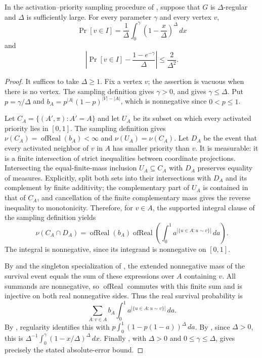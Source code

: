 \begin{lemma}
In the activation--priority sampling procedure of
, suppose that $G$ is $\Delta$-regular
and $\Delta$ is sufficiently large.  For every parameter $\gamma$ and every
vertex $v$,
\[
\Pr[v\in I]=
\frac1\Delta\int_0^\gamma \left(1-\frac{x}{\Delta}\right)^\Delta\,dx
\]
and
\[
\left|\Pr[v\in I]-\frac{1-e^{-\gamma}}{\Delta}\right|
\le \frac2{\Delta^2}.
\]
\end{lemma}
\begin{proof}
It suffices to take $\Delta\ge1$. Fix a vertex $v$; the assertion is
vacuous when there is no vertex. The sampling definition
 gives $\gamma>0$, and
 gives $\gamma\le\Delta$.
Put $p=\gamma/\Delta$ and
$b_A=p^{|A|}(1-p)^{|V|-|A|}$, which is nonnegative since $0<p\le1$.

Let $C_A=\{(A',\pi):A'=A\}$ and let $U_A$ be its subset on which every
activated priority lies in $[0,1]$. The sampling definition gives
$\nu(C_A)=\operatorname{ofReal}(b_A)<\infty$ and
$\nu(U_A)=\nu(C_A)$. Let $D_A$ be the event that every activated neighbor
of $v$ in $A$ has smaller priority than $v$. It is measurable: it is a
finite intersection of strict inequalities between coordinate projections.
Intersecting the equal-finite-mass inclusion $U_A\subseteq C_A$ with
$D_A$ preserves equality of measures. Explicitly, split both sets into
their intersections with $D_A$ and its complement by finite additivity;
the complementary part of $U_A$ is contained in that of $C_A$, and
cancellation of the finite complementary mass gives the reverse
inequality to monotonicity. Therefore, for $v\in A$, the supported
integral clause of the sampling definition yields
\[
 \nu(C_A\cap D_A)=\operatorname{ofReal}(b_A)
 \operatorname{ofReal}\left(\int_0^1
 a^{|\{u\in A:u\sim v\}|}\,da\right).
\]
The integral is nonnegative, since its integrand is nonnegative on $[0,1]$.

By  and the singleton
specialization of ,
the extended nonnegative mass of the survival event equals the sum of
these expressions over $A$ containing $v$. All summands are nonnegative,
so $\operatorname{ofReal}$ commutes with this finite sum and is injective
on both real nonnegative sides. Thus the real survival probability is
\[
 \sum_{A:v\in A} b_A\int_0^1a^{|\{u\in A:u\sim v\}|}\,da.
\]
By , regularity identifies
this with $p\int_0^1(1-p(1-a))^\Delta\,da$.
By , since $\Delta>0$, this is
$\Delta^{-1}\int_0^\gamma(1-x/\Delta)^\Delta\,dx$.
Finally , with
$\Delta>0$ and $0\le\gamma\le\Delta$, gives precisely the stated
absolute-error bound.
\end{proof}
